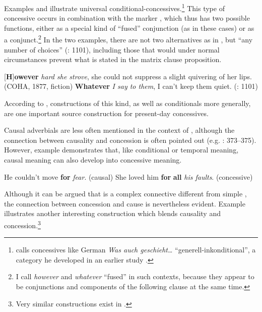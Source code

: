 Examples  and  illustrate universal conditional-concessives.\footnote{\citet[64–65]{Hermodsson1994} calls concessives like German \textit{Was auch geschieht}… “generell-inkonditional”, a category he developed in an earlier study \citep[80]{Hermodsson1978}.} This type of concessive occurs in combination with the marker , which thus has two possible functions, either as a special kind of “fused” conjunction (as in these cases) or as a conjunct.\footnote{I call \textit{however} and \textit{whatever} “fused” in such contexts, because they appear to be conjunctions and components of the following clause at the same time.}  In the two examples, there are not two alternatives as in , but “any number of choices” (\citealt{QuirkEtAl1985}: 1101), including those that would under normal circumstances prevent what is stated in the matrix clause proposition.

\ea\label{ex:4}   \label{bkm:Ref467067268}[\textbf{H}]\textbf{owever} \textit{hard she strove}, she could not suppress a slight quivering of her lips. (COHA, 1877, fiction)
    \ex\label{ex:5}\label{bkm:Ref467067270}\textbf{Whatever} \textit{I say to them}, I can’t keep them quiet. (\citealt{QuirkEtAl1985}: 1101)
\z

According to \citet[638]{König1991b}, constructions of this kind, as well as conditionals more generally, are one important source construction for present-day concessives.

Causal adverbials are less often mentioned in the context of  \citep[168]{Hilpert2013a}, although the connection between causality and concession is often pointed out (e.g. \citealt{Verhagen2000}: 373–375). However, example  demonstrates that, like conditional or temporal meaning, causal meaning can also develop into concessive meaning.

\ea\label{ex:6}
    \ea\label{bkm:Ref431802276}He couldn’t move \textbf{for} \textit{fear}. (causal)
    \ex\label{ex:6b}She loved him \textbf{for} \textbf{all} \textit{his faults}. (concessive)
\z
\z

Although it can be argued that  is a complex connective different from simple , the connection between concession and cause is nevertheless evident. Example ‎ illustrates another interesting construction which blends causality and concession.\footnote{Very similar constructions exist in .}

